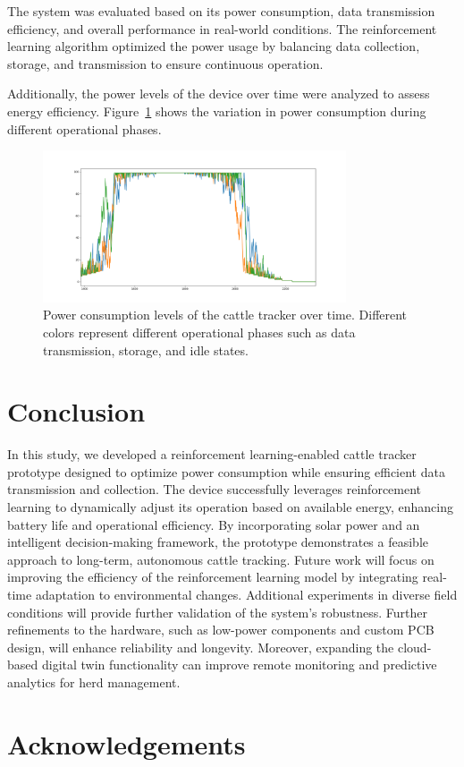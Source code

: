 \documentclass[10pt]{cai}
\begin{document}
The system was evaluated based on its power consumption, data transmission efficiency, and overall performance in real-world conditions. The reinforcement learning algorithm optimized the power usage by balancing data collection, storage, and transmission to ensure continuous operation.

Additionally, the power levels of the device over time were analyzed to assess energy efficiency. Figure~\ref{fig:power_levels} shows the variation in power consumption during different operational phases.

\begin{figure}[htbp]
    \centering
    \includegraphics[width=0.8\textwidth]{./figs/power_levels.png}
    \caption{Power consumption levels of the cattle tracker over time. Different colors represent different operational phases such as data transmission, storage, and idle states.}
    \label{fig:power_levels}
\end{figure}

\section{Conclusion}
In this study, we developed a reinforcement learning-enabled cattle tracker prototype designed to optimize power consumption while ensuring efficient data transmission and collection. The device successfully leverages reinforcement learning to dynamically adjust its operation based on available energy, enhancing battery life and operational efficiency. By incorporating solar power and an intelligent decision-making framework, the prototype demonstrates a feasible approach to long-term, autonomous cattle tracking.
Future work will focus on improving the efficiency of the reinforcement learning model by integrating real-time adaptation to environmental changes. Additional experiments in diverse field conditions will provide further validation of the system's robustness. Further refinements to the hardware, such as low-power components and custom PCB design, will enhance reliability and longevity. Moreover, expanding the cloud-based digital twin functionality can improve remote monitoring and predictive analytics for herd management.

\section*{Acknowledgements}

\printbibliography[heading=subbibintoc]
\end{document}
